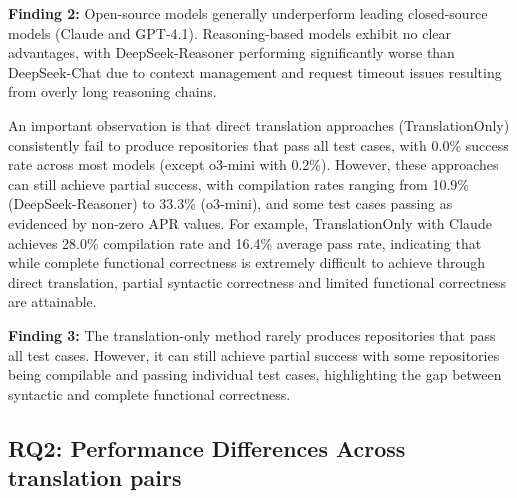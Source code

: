 \begin{myboxc} \textbf{Finding 2: }
Open-source models generally underperform leading closed-source models (Claude and GPT-4.1). Reasoning-based models exhibit no clear advantages, with DeepSeek-Reasoner performing significantly worse than DeepSeek-Chat due to context management and request timeout issues resulting from overly long reasoning chains.
\end{myboxc}

An important observation is that direct translation approaches (TranslationOnly) consistently fail to produce repositories that pass all test cases, with 0.0\% success rate across most models (except o3-mini with 0.2\%). However, these approaches can still achieve partial success, with compilation rates ranging from 10.9\% (DeepSeek-Reasoner) to 33.3\% (o3-mini), and some test cases passing as evidenced by non-zero APR values. For example, TranslationOnly with Claude achieves 28.0\% compilation rate and 16.4\% average pass rate, indicating that while complete functional correctness is extremely difficult to achieve through direct translation, partial syntactic correctness and limited functional correctness are attainable.

\begin{myboxc} \textbf{Finding 3: }
The translation-only method rarely produces repositories that pass all test cases. However, it can still achieve partial success with some repositories being compilable and passing individual test cases, highlighting the gap between syntactic and complete functional correctness.
\end{myboxc}




\subsection{RQ2: Performance Differences Across translation pairs}  
\label{PerformanceOfLanguagePairs}


